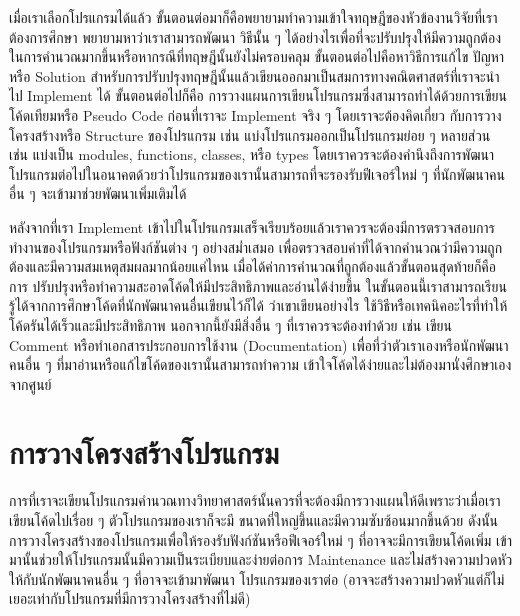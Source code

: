 เมื่อเราเลือกโปรแกรมได้แล้ว ขั้นตอนต่อมาก็คือพยายามทำความเข้าใจทฤษฎีของหัวข้องานวิจัยที่เราต้องการศึกษา พยายามหาว่าเราสามารถพัฒนา%
วิธีนั้น ๆ ได้อย่างไรเพื่อที่จะปรับปรุงให้มีความถูกต้องในการคำนวณมากขึ้นหรือหากรณีที่ทฤษฎีนั้นยังไม่ครอบคลุม ขั้นตอนต่อไปคือหาวิธีการแก้ไข%
ปัญหาหรือ Solution สำหรับการปรับปรุงทฤษฎีนั้นแล้วเขียนออกมาเป็นสมการทางคณิตศาสตร์ที่เราจะนำไป Implement ได้ ขั้นตอนต่อไปก็คือ%
การวางแผนการเขียนโปรแกรมซึ่งสามารถทำได้ด้วยการเขียนโค้ดเทียมหรือ Pseudo Code ก่อนที่เราจะ Implement จริง ๆ โดยเราจะต้องคิดเกี่ยว%
กับการวางโครงสร้างหรือ Structure ของโปรแกรม เช่น แบ่งโปรแกรมออกเป็นโปรแกรมย่อย ๆ หลายส่วน เช่น แบ่งเป็น modules, functions,
classes, หรือ types โดยเราควรจะต้องคำนึงถึงการพัฒนาโปรแกรมต่อไปในอนาคตด้วยว่าโปรแกรมของเรานั้นสามารถที่จะรองรับฟีเจอร์ใหม่ ๆ
ที่นักพัฒนาคนอื่น ๆ จะเข้ามาช่วยพัฒนาเพิ่มเติมได้

หลังจากที่เรา Implement เข้าไปในโปรแกรมเสร็จเรียบร้อยแล้วเราควรจะต้องมีการตรวจสอบการทำงานของโปรแกรมหรือฟังก์ชันต่าง ๆ อย่างสม่ำเสมอ%
เพื่อตรวจสอบค่าที่ได้จากคำนวณว่ามีความถูกต้องและมีความสมเหตุสมผลมากน้อยแค่ไหน เมื่อได้ค่าการคำนวณที่ถูกต้องแล้วขั้นตอนสุดท้ายก็คือการ%
ปรับปรุงหรือทำความสะอาดโค้ดให้มีประสิทธิภาพและอ่านได้ง่ายขึ้น ในขั้นตอนนี้เราสามารถเรียนรู้ได้จากการศึกษาโค้ดที่นักพัฒนาคนอื่นเขียนไว้ก็ได้%
ว่าเขาเขียนอย่างไร ใช้วิธีหรือเทคนิคอะไรที่ทำให้โค้ดรันได้เร็วและมีประสิทธิภาพ นอกจากนี้ยังมีสิ่งอื่น ๆ ที่เราควรจะต้องทำด้วย เช่น เขียน Comment
หรือทำเอกสารประกอบการใช้งาน (Documentation) เพื่อที่ว่าตัวเราเองหรือนักพัฒนาคนอื่น ๆ ที่มาอ่านหรือแก้ไขโค้ดของเรานั้นสามารถทำความ%
เข้าใจโค้ดได้ง่ายและไม่ต้องมานั่งศึกษาเองจากศูนย์

\section{การวางโครงสร้างโปรแกรม}

การที่เราจะเขียนโปรแกรมคำนวณทางวิทยาศาสตร์นั้นควรที่จะต้องมีการวางแผนให้ดีเพราะว่าเมื่อเราเขียนโค้ดไปเรื่อย ๆ ตัวโปรแกรมของเราก็จะมี%
ขนาดที่ใหญ่ขึ้นและมีความซับซ้อนมากขึ้นด้วย ดังนั้นการวางโครงสร้างของโปรแกรมเพื่อให้รองรับฟังก์ชันหรือฟีเจอร์ใหม่ ๆ ที่อาจจะมีการเขียนโค้ดเพิ่ม%
เข้ามานั้นช่วยให้โปรแกรมนั้นมีความเป็นระเบียบและง่ายต่อการ Maintenance และไม่สร้างความปวดหัวให้กับนักพัฒนาคนอื่น ๆ ที่อาจจะเข้ามาพัฒนา%
โปรแกรมของเราต่อ (อาจจะสร้างความปวดหัวแต่ก็ไม่เยอะเท่ากับโปรแกรมที่มีการวางโครงสร้างที่ไม่ดี)

